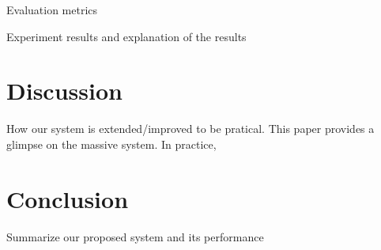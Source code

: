 \documentclass[conference]{IEEEtran}
\begin{document}
Evaluation metrics

Experiment results and explanation of the results
\section{Discussion}

How our system is extended/improved to be pratical. This paper provides a glimpse on the massive system. In practice, 

\section{Conclusion}

Summarize our proposed system and its performance












%
%
%






\end{document}
